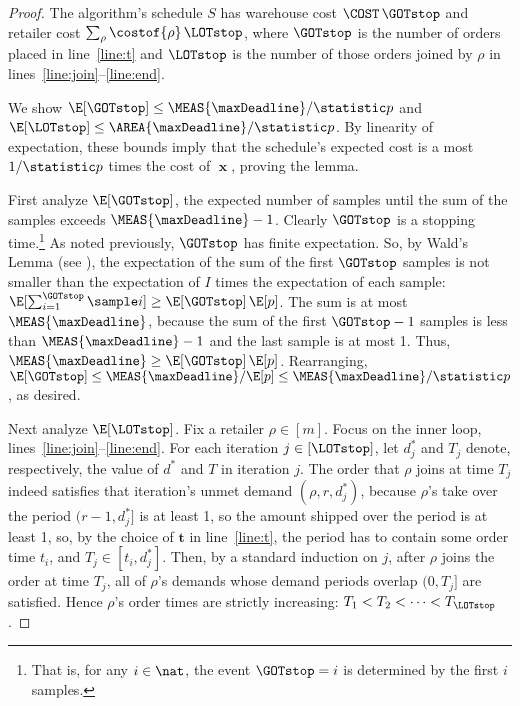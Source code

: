 \begin{proof}
  The algorithm's schedule $S$ has warehouse cost $\COST\, \GOTstop$
  and retailer cost $\sum_{\rho} \costof{\rho}\, \LOTstop$,
  where $\GOTstop$ is the number of orders placed in line~\ref{line:t}
  and $\LOTstop$ is the number of those orders joined by $\rho$
  in lines~\ref{line:join}--\ref{line:end}.

  We show $\E[\GOTstop] \le \MEAS{\maxDeadline}/\statistic p$
  and $\E[\LOTstop] \le \AREA{\maxDeadline}/\statistic p$.
  By linearity of expectation, these bounds imply that
  the schedule's expected cost is a most $1/\statistic p$ times the cost of $\mbfx$,
  proving the lemma.

  \smallskip

  First analyze $\E[\GOTstop]$, the expected number of samples until the sum
  of the samples exceeds \mbox{$\MEAS{\maxDeadline}-1$}. Clearly $\GOTstop$ is a
  stopping time.\footnote {That is, for any $i\in\nat$, the event $\GOTstop =
  i$ is determined by the first $i$ samples.} As noted previously, $\GOTstop$
  has finite expectation. So, by Wald's Lemma (see ), the expectation of the sum of the first $\GOTstop$ samples
  is not smaller than the expectation
  of $I$ times the expectation of each sample: $\E[\sum_{i=1}^\GOTstop \sample
  i] \geq \E[\GOTstop]\, \E[p]$. The sum is at most $\MEAS{\maxDeadline}$,
  because the sum of the first $\GOTstop-1$ samples is less than
  $\MEAS{\maxDeadline}-1$ and the last sample is at most 1. Thus,
  $\MEAS{\maxDeadline} \ge \E[\GOTstop]\, \E[p]$. Rearranging, $\E[\GOTstop]
  \le \MEAS{\maxDeadline}/\E[p] \le \MEAS{\maxDeadline}/\statistic p$, as
  desired.

  \smallskip

  Next analyze $\E[\LOTstop]$.
  Fix a retailer $\rho\in[m]$.
  Focus on the inner loop, lines~\ref{line:join}--\ref{line:end}.
  For each iteration $j\in[\LOTstop]$,  let $d^*_j$
  and $T_j$ denote, respectively, the value of $d^*$ and $T$
  in iteration $j$.
  The order that $\rho$ joins at time $T_j$
  indeed satisfies that iteration's unmet demand $(\rho, r, d^*_j)$,
  because $\rho$'s take over the period $(r-1,d^*_j]$ is at least 1,
  so the amount shipped over the period is at least 1,
  so, by the choice of $\mathbf t$ in line~\ref{line:t},
  the period has to contain some order time $t_i$,
  and $T_j \in [t_i, d^*_j]$.
  Then, by a standard induction on $j$, after $\rho$ joins the order at time $T_j$,
  all of $\rho$'s demands whose demand periods overlap $(0,T_j]$ are satisfied.
  Hence $\rho$'s order times are strictly increasing:
  $T_1 < T_2 < \cdots < T_{\LOTstop}$.


\end{proof}
